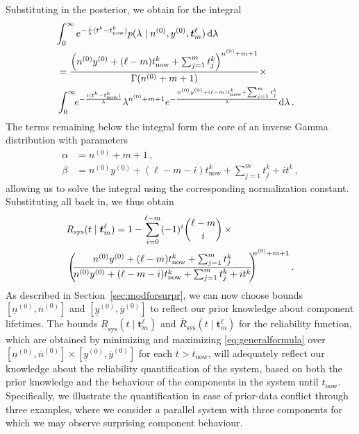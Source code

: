 \documentclass[12pt,a4paper,twocolumn,fleqn]{narms}
\newcommand{\dd}{\,\mathrm{d}}
\renewcommand{\vec}[1]{{\bm#1}}
\newcommand{\uz}{^{(0)}} %
\newcommand{\ul}[1]{\underline{#1}}
\newcommand{\ol}[1]{\overline{#1}}
\newcommand{\lRsys}{\ul{R}_\text{sys}}
\newcommand{\uRsys}{\ol{R}_\text{sys}}
\def\yz{y\uz}
\def\yzl{\ul{y}\uz}
\def\yzu{\ol{y}\uz}
\def\nz{n\uz}
\def\nzl{\ul{n}\uz}
\def\nzu{\ol{n}\uz}
\begin{document}
Substituting in the posterior, we obtain for the integral
\begin{align}
\lefteqn{%
    \int_0^\infty e^{-\frac{i}{\lambda} (t^k - t_\text{now}^k)} %
    p(\lambda \mid \nz, \yz, \vec{t}_m^\ell) \dd\lambda } \\
 &= \frac{\left(\nz \yz + (\ell-m) t_\text{now}^k + \sum_{j=1}^{m} t_j^k \right)^{\nz + m + 1}}{\Gamma(\nz + m + 1)}\times \nonumber \\
 &  \int_0^\infty\!\! e^{-\frac{i(t^k - t_\text{now}^k)}{\lambda}} \lambda^{\nz + m + 1}
    e^{-\frac{\nz \yz + (\ell-m) t_\text{now}^k + \sum_{j=1}^m t_j^k}{\lambda}}\! \dd\lambda\,. \nonumber
\end{align}
The terms remaining below the integral form the core of an inverse Gamma distribution
with parameters
\begin{align}
\alpha &= \nz + m + 1\,,\\
\beta  &= \nz \yz + (\ell - m - i) t_\text{now}^k + \sum_{j=1}^{m} t_j^k + i t^k\,,
\end{align}
allowing us to solve the integral using the corresponding normalization constant.
%
Substituting all back in, we thus obtain
\begin{align}
\label{eq:generalformula}
\lefteqn{%
R_\text{sys}(t \mid \vec{t}_m^\ell)
  = 1 - \sum_{i=0}^{\ell-m} (-1)^i {\ell-m \choose i} \, \times } & \\
 & %
   \left(\!\! \frac{\nz \yz + (\ell-m)   t_\text{now}^k + \sum_{j=1}^{m} t_j^k}%
                   {\nz \yz + (\ell-m-i) t_\text{now}^k + \sum_{j=1}^{m} t_j^k + i t^k} \!\!\right)^{\!\!\!\nz + m + 1}.\nonumber
\end{align}
%
As described in Section~\ref{sec:modforsurpr},
we can now choose bounds $[\nzl, \nzu]$ and $[\yzl, \yzu]$
to reflect our prior knowledge about component lifetimes.
The bounds $\lRsys(t \mid \vec{t}_m^\ell)$ and $\uRsys(t \mid \vec{t}_m^\ell)$ for the reliability function,
which are obtained by minimizing and maximizing \eqref{eq:generalformula}
over $[\nzl, \nzu] \times [\yzl, \yzu]$ for each $t > t_\text{now}$,
will adequately reflect our knowledge about the reliability quantification of the system,
based on both the prior knowledge and the behaviour of the components in the system until $t_\text{now}$.
Specifically, we illustrate the quantification in case of prior-data conflict through three examples,
where we consider a parallel system with three components
for which we may observe surprising component behaviour.
\end{document}
